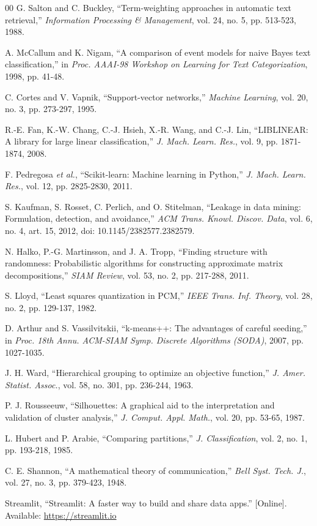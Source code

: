 \documentclass[conference]{IEEEtran}
\begin{document}
\begin{thebibliography}{00}
 G. Salton and C. Buckley, ``Term-weighting approaches in automatic text retrieval,'' \textit{Information Processing \& Management}, vol. 24, no. 5, pp. 513-523, 1988.

 A. McCallum and K. Nigam, ``A comparison of event models for naive Bayes text classification,'' in \textit{Proc. AAAI-98 Workshop on Learning for Text Categorization}, 1998, pp. 41-48.

 C. Cortes and V. Vapnik, ``Support-vector networks,'' \textit{Machine Learning}, vol. 20, no. 3, pp. 273-297, 1995.

 R.-E. Fan, K.-W. Chang, C.-J. Hsieh, X.-R. Wang, and C.-J. Lin, ``LIBLINEAR: A library for large linear classification,'' \textit{J. Mach. Learn. Res.}, vol. 9, pp. 1871-1874, 2008.

 F. Pedregosa \textit{et al.}, ``Scikit-learn: Machine learning in Python,'' \textit{J. Mach. Learn. Res.}, vol. 12, pp. 2825-2830, 2011.

 S. Kaufman, S. Rosset, C. Perlich, and O. Stitelman, ``Leakage in data mining: Formulation, detection, and avoidance,'' \textit{ACM Trans. Knowl. Discov. Data}, vol. 6, no. 4, art. 15, 2012, doi: 10.1145/2382577.2382579.

 N. Halko, P.-G. Martinsson, and J. A. Tropp, ``Finding structure with randomness: Probabilistic algorithms for constructing approximate matrix decompositions,'' \textit{SIAM Review}, vol. 53, no. 2, pp. 217-288, 2011.

 S. Lloyd, ``Least squares quantization in PCM,'' \textit{IEEE Trans. Inf. Theory}, vol. 28, no. 2, pp. 129-137, 1982.

 D. Arthur and S. Vassilvitskii, ``k-means++: The advantages of careful seeding,'' in \textit{Proc. 18th Annu. ACM-SIAM Symp. Discrete Algorithms (SODA)}, 2007, pp. 1027-1035.

 J. H. Ward, ``Hierarchical grouping to optimize an objective function,'' \textit{J. Amer. Statist. Assoc.}, vol. 58, no. 301, pp. 236-244, 1963.

 P. J. Rousseeuw, ``Silhouettes: A graphical aid to the interpretation and validation of cluster analysis,'' \textit{J. Comput. Appl. Math.}, vol. 20, pp. 53-65, 1987.

 L. Hubert and P. Arabie, ``Comparing partitions,'' \textit{J. Classification}, vol. 2, no. 1, pp. 193-218, 1985.

 C. E. Shannon, ``A mathematical theory of communication,'' \textit{Bell Syst. Tech. J.}, vol. 27, no. 3, pp. 379-423, 1948.

 Streamlit, ``Streamlit: A faster way to build and share data apps.'' [Online]. Available: \url{https://streamlit.io}
\end{thebibliography}
\end{document}
